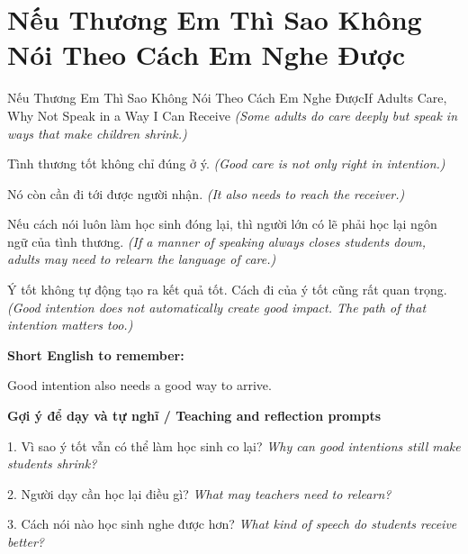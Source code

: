 \section{Nếu Thương Em Thì Sao Không Nói Theo Cách Em Nghe Được}
\begin{truyen}{Nếu Thương Em Thì Sao Không Nói Theo Cách Em Nghe Được}{If Adults Care, Why Not Speak in a Way I Can Receive}
\textit{(Some adults do care deeply but speak in ways that make children shrink.)}

Tình thương tốt không chỉ đúng ở ý.
\textit{(Good care is not only right in intention.)}

Nó còn cần đi tới được người nhận.
\textit{(It also needs to reach the receiver.)}

Nếu cách nói luôn làm học sinh đóng lại, thì người lớn có lẽ phải học lại ngôn ngữ của tình thương.
\textit{(If a manner of speaking always closes students down, adults may need to relearn the language of care.)}

\end{truyen}

\begin{baihoc}
Ý tốt không tự động tạo ra kết quả tốt. Cách đi của ý tốt cũng rất quan trọng.
\textit{(Good intention does not automatically create good impact. The path of that intention matters too.)}
\end{baihoc}

\begin{ghinhoanh}
\textbf{Short English to remember:}

Good intention also needs a good way to arrive.

\end{ghinhoanh}

\begin{tuhocnhanh}
\textbf{Gợi ý để dạy và tự nghĩ / Teaching and reflection prompts}

1. Vì sao ý tốt vẫn có thể làm học sinh co lại? \textit{Why can good intentions still make students shrink?}

2. Người dạy cần học lại điều gì? \textit{What may teachers need to relearn?}

3. Cách nói nào học sinh nghe được hơn? \textit{What kind of speech do students receive better?}
\end{tuhocnhanh}
\ngancach

